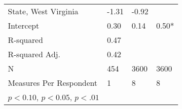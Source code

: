 \begin{table}
\begin{center}
\begin{tabular}{llll}
            State, West Virginia               & -1.31   & -0.92    &          \\
            Intercept                          & 0.30    & 0.14     & 0.50*    \\
            \hline
            R-squared                          & 0.47    &          &          \\
            R-squared Adj.                     & 0.42    &          &          \\
            N                                  & 454     & 3600     & 3600     \\
            Measures Per Respondent            & 1       & 8        & 8        \\
            \hline
            \footnotesize \sym{*} \(p<0.10\), \sym{**} \(p<0.05\), \sym{***} \(p<.01\)
            \hline
        \end{tabular}
    \end{center}
\end{table}